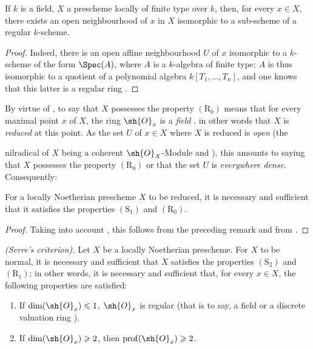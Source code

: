 \begin{proposition}[5.8.3]
\label{IV.5.8.3}
If $k$ is a field, $X$ a prescheme locally of finite type over $k$, then, for every $x\in X$, there exists an open neighbourhood of $x$ in $X$ isomorphic to a sub-scheme of a regular $k$-scheme.
\end{proposition}

\begin{proof}
Indeed, there is an open affine neighbourhood $U$ of $x$ isomorphic to a $k$-scheme of the form $\Spec(A)$, where $A$ is a $k$-algebra of finite type; $A$ is thus isomorphic to a quotient of a polynomial algebra $k[T_1,\ldots,T_n]$, and one knows that this latter is a regular ring .
\end{proof}

\begin{env}[5.8.4]
\label{IV.5.8.4}
By virtue of , to say that $X$ possesses the property $(\mathrm{R}_0)$ means that for every maximal point $x$ of $X$, the ring $\sh{O}_x$ is a \emph{field} , in other words that $X$ is \emph{reduced} at this point.
As the set $U$ of $x\in X$ where $X$ is reduced is \emph{open} (the


nilradical of $X$ being a coherent $\sh{O}_X$-Module  and ), this amounts to saying that $X$ possesses the property $(\mathrm{R}_0)$ or that the set $U$ is \emph{everywhere dense}.
Consequently:
\end{env}

\begin{proposition}[5.8.5]
\label{IV.5.8.5}
For a locally Noetherian prescheme $X$ to be reduced, it is necessary and sufficient that it satisfies the properties $(\mathrm{S}_1)$ and $(\mathrm{R}_0)$.
\end{proposition}

\begin{proof}
Taking into account , this follows from the preceding remark and from .
\end{proof}

\begin{theorem}[5.8.6]
\label{IV.5.8.6}
\emph{(Serre's criterion).}
Let $X$ be a locally Noetherian prescheme.
For $X$ to be normal, it is necessary and sufficient that $X$ satisfies the properties $(\mathrm{S}_2)$ and $(\mathrm{R}_1)$; in other words, it is necessary and sufficient that, for every $x\in X$, the following properties are satisfied:
\begin{enumerate}[label=\emph{\roman*)}]
  \item If $\dim(\sh{O}_x)\leqslant 1$, $\sh{O}_x$ is regular (that is to say, a field or a discrete valuation ring ).
  \item If $\dim(\sh{O}_x)\geqslant 2$, then $\operatorname{prof}(\sh{O}_x)\geqslant 2$.
\end{enumerate}
\end{theorem}

